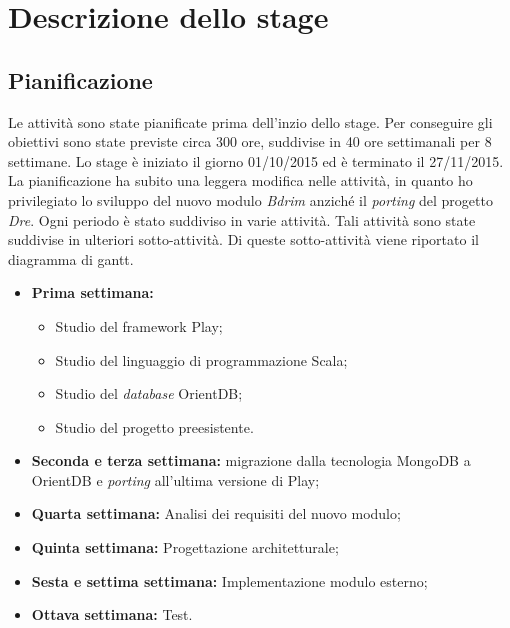 
\chapter{Descrizione dello stage}
\label{cap:descrizione-stage}


\section{Pianificazione}
Le attività sono state pianificate prima dell'inzio dello stage. Per conseguire gli obiettivi sono state previste circa 300 ore, suddivise in 40 ore settimanali per 8 settimane. Lo stage è iniziato il giorno 01/10/2015 ed è terminato il 27/11/2015. La pianificazione ha subito una leggera modifica nelle attività, in quanto ho privilegiato lo sviluppo del nuovo modulo \textit{Bdrim} anziché il \textit{porting} del progetto \textit{Dre}. Ogni periodo è stato suddiviso in varie attività. Tali attività sono state suddivise in ulteriori sotto-attività. Di queste sotto-attività viene riportato il diagramma di \gls{gantt}.
\begin{itemize}
	\item \textbf{Prima settimana:}
	\begin{itemize}
		\item Studio del \gls{framework} Play;
		\item Studio del linguaggio di programmazione Scala;
		\item Studio del \textit{database} OrientDB;
		\item Studio del progetto preesistente.
	\end{itemize}
	\item \textbf{Seconda e terza settimana: }migrazione dalla tecnologia MongoDB a OrientDB e \textit{porting} all'ultima versione di Play;
	\item \textbf{Quarta settimana:} Analisi dei requisiti del nuovo modulo;
	\item \textbf{Quinta settimana:} Progettazione architetturale;
	\item \textbf{Sesta e settima settimana:} Implementazione modulo esterno;
	\item \textbf{Ottava settimana:} Test.
\end{itemize}


